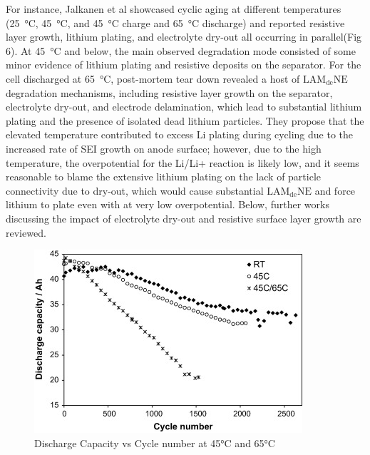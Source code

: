 \documentclass{article}
\begin{document}
For instance, Jalkanen et al \cite{jalkanen_cycle_2015} showcased cyclic aging at different temperatures (\SI{25}{\celsius}, \SI{45}{\celsius}, and \SI{45}{\celsius} charge and \SI{65}{\celsius} discharge) and reported resistive layer growth, lithium plating, and electrolyte dry-out all occurring in parallel(Fig 6). At \SI{45}{\celsius} and below, the main observed degradation mode consisted of some minor evidence of lithium plating and resistive deposits on the separator. For the cell discharged at \SI{65}{\celsius}, post-mortem tear down revealed a host of $\mathrm{LAM_{de}NE}$ degradation mechanisms, including resistive layer growth on the separator, electrolyte dry-out, and electrode delamination, which lead to substantial lithium plating and the presence of isolated dead lithium particles. They propose that the elevated temperature contributed to excess Li plating during cycling due to the increased rate of SEI growth on anode surface; however, due to the high temperature, the overpotential for the Li/Li+ reaction is likely low, and it seems reasonable to blame the extensive lithium plating on the lack of particle connectivity due to dry-out, which would cause substantial $\mathrm{LAM_{de}NE}$ and force lithium to plate even with at very low overpotential. Below, further works discussing the impact of electrolyte dry-out and resistive surface layer growth are reviewed.
\begin{figure}
\centering
\includegraphics[scale = 0.9]{images/Discharge Capacity vs Cycle Number for 45C & 65C.jpg}
\caption{Discharge Capacity vs Cycle number at 45°C and 65°C  \cite{jalkanen_cycle_2015}}
\label{fig:DischargeCapCycle}
\end{figure}
\end{document}

